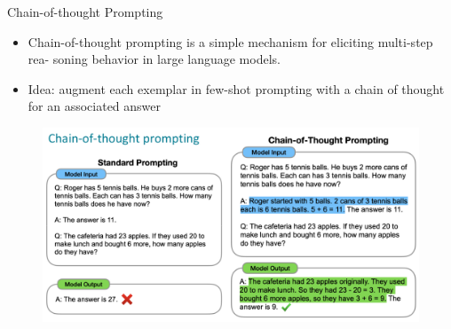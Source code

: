 \documentclass[handout]{beamer}
\begin{document}
\begin{frame}{Chain-of-thought Prompting}

\begin{scriptsize}
\begin{itemize}
\item Chain-of-thought prompting is a simple mechanism for eliciting multi-step rea-
soning behavior in large language models.
\item  Idea: augment each exemplar in few-shot prompting with a chain of thought for an associated answer \cite{wei2022chain}
\end{itemize}
\end{scriptsize}


 \begin{figure}[h]
        	\includegraphics[scale = 0.3]{pics/chainoftought.png}
        \end{figure}



\end{frame}
\end{document}
